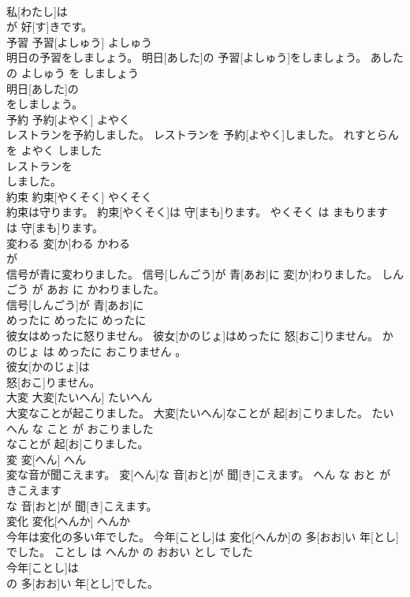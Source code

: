 \documentclass[8pt]{extreport}
\begin{document}
\begin{CJK}{UTF8}{min}
\\	私[わたし]は
\\	が 好[す]きです。		
\\	予習	予習[よしゅう]	よしゅう	
\\	明日の予習をしましょう。	明日[あした]の 予習[よしゅう]をしましょう。	あした の よしゅう を しましょう	
\\	明日[あした]の
\\	をしましょう。		
\\	予約	予約[よやく]	よやく	
\\	レストランを予約しました。	レストランを 予約[よやく]しました。	れすとらん を よやく しました	
\\	レストランを
\\	しました。		
\\	約束	約束[やくそく]	やくそく	
\\	約束は守ります。	約束[やくそく]は 守[まも]ります。	やくそく は まもります	
\\	は 守[まも]ります。		
\\	変わる	変[か]わる	かわる	
\\	が		
\\	信号が青に変わりました。	信号[しんごう]が 青[あお]に 変[か]わりました。	しんごう が あお に かわりました。	
\\	信号[しんごう]が 青[あお]に
\\	めったに	めったに	めったに	
\\	彼女はめったに怒りません。	彼女[かのじょ]はめったに 怒[おこ]りません。	かのじょ は めったに おこりません 。	
\\	彼女[かのじょ]は
\\	怒[おこ]りません。		
\\	大変	大変[たいへん]	たいへん	
\\	大変なことが起こりました。	大変[たいへん]なことが 起[お]こりました。	たいへん な こと が おこりました	
\\	なことが 起[お]こりました。		
\\	変	変[へん]	へん	
\\	変な音が聞こえます。	変[へん]な 音[おと]が 聞[き]こえます。	へん な おと が きこえます	
\\	な 音[おと]が 聞[き]こえます。		
\\	変化	変化[へんか]	へんか	
\\	今年は変化の多い年でした。	今年[ことし]は 変化[へんか]の 多[おお]い 年[とし]でした。	ことし は へんか の おおい とし でした	
\\	今年[ことし]は
\\	の 多[おお]い 年[とし]でした。		

\end{CJK}
\end{document}
